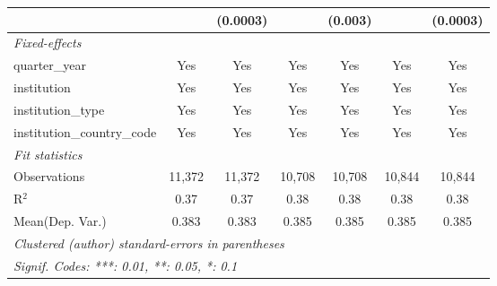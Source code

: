 \begin{tabular}{lcccccc}
                                      &             & (0.0003) &             & (0.003)      &             & (0.0003)\\   
   \midrule
   \emph{Fixed-effects}\\
   quarter\_year                      & Yes         & Yes      & Yes         & Yes          & Yes         & Yes\\  
   institution                        & Yes         & Yes      & Yes         & Yes          & Yes         & Yes\\  
   institution\_type                  & Yes         & Yes      & Yes         & Yes          & Yes         & Yes\\  
   institution\_country\_code         & Yes         & Yes      & Yes         & Yes          & Yes         & Yes\\  
   \midrule
   \emph{Fit statistics}\\
   Observations                       & 11,372      & 11,372   & 10,708      & 10,708       & 10,844      & 10,844\\  
   R$^2$                              & 0.37        & 0.37     & 0.38        & 0.38         & 0.38        & 0.38\\  
Mean(Dep. Var.) & 0.383 & 0.383 & 0.385 & 0.385 & 0.385 & 0.385 \\
   \midrule \midrule
   \multicolumn{7}{l}{\emph{Clustered (author) standard-errors in parentheses}}\\
   \multicolumn{7}{l}{\emph{Signif. Codes: ***: 0.01, **: 0.05, *: 0.1}}\\
\end{tabular}
\par\endgroup
